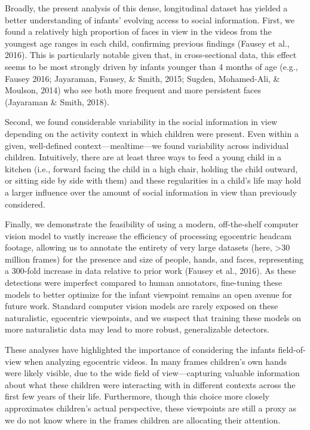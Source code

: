 \documentclass[10pt, letterpaper]{article}
\begin{document}
Broadly, the present analysis of this dense, longitudinal dataset has
yielded a better understanding of infants' evolving access to social
information. First, we found a relatively high proportion of faces in
view in the videos from the youngest age ranges in each child,
confirming previous findings (Fausey et al., 2016). This is particularly
notable given that, in cross-sectional data, this effect seems to be
most strongly driven by infants younger than 4 months of age (e.g.,
Fausey 2016; Jayaraman, Fausey, \& Smith, 2015; Sugden, Mohamed-Ali, \&
Moulson, 2014) who see both more frequent and more persistent faces
(Jayaraman \& Smith, 2018).

Second, we found considerable variability in the social information in
view depending on the activity context in which children were present.
Even within a given, well-defined context---mealtime---we found
variability across individual children. Intuitively, there are at least
three ways to feed a young child in a kitchen (i.e., forward facing the
child in a high chair, holding the child outward, or sitting side by
side with them) and these regularities in a child's life may hold a
larger influence over the amount of social information in view than
previously considered.

Finally, we demonstrate the feasibility of using a modern, off-the-shelf
computer vision model to vastly increase the efficiency of processing
egocentric headcam footage, allowing us to annotate the entirety of very
large datasets (here, \textgreater{}30 million frames) for the presence
and size of people, hands, and faces, representing a 300-fold increase
in data relative to prior work (Fausey et al., 2016). As these
detections were imperfect compared to human annotators, fine-tuning
these models to better optimize for the infant viewpoint remains an open
avenue for future work. Standard computer vision models are rarely
exposed on these naturalistic, egocentric viewpoints, and we suspect
that training these models on more naturalistic data may lead to more
robust, generalizable detectors.

These analyses have highlighted the importance of considering the
infants field-of-view when analyzing egocentric videos. In many frames
children's own hands were likely visible, due to the wide field of
view---capturing valuable information about what these children were
interacting with in different contexts across the first few years of
their life. Furthermore, though this choice more closely approximates
children's actual perspective, these viewpoints are still a proxy as we
do not know where in the frames children are allocating their attention.
\end{document}
